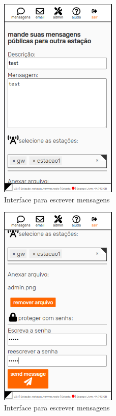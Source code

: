 \documentclass[11pt,a4paper]{article}
\begin{document}
\begin{figure}[H]
    \centering
    \includegraphics[width=0.5\textwidth]{screenshots/frontend/pt_kn/publicas.png}
    \caption{Interface para escrever mensagens}
    \label{fig:compose}
\end{figure}


\begin{figure}[H]
    \centering
    \includegraphics[width=0.5\textwidth]{screenshots/frontend/pt_kn/publicas2.png}
    \caption{Interface para escrever mensagens}
    \label{fig:compose2}
\end{figure}
\end{document}
